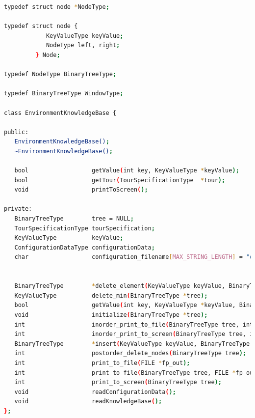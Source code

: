 \documentclass{CSSRforAfrica}
\begin{document}
\begin{appendices}
\begin{lstlisting}[style=withoutNumbering, language=bash]
typedef struct node *NodeType;

typedef struct node {
            KeyValueType keyValue;
            NodeType left, right;
         } Node;

typedef NodeType BinaryTreeType;

typedef BinaryTreeType WindowType;

class EnvironmentKnowledgeBase {

public:
   EnvironmentKnowledgeBase();
   ~EnvironmentKnowledgeBase();
   
   bool                  getValue(int key, KeyValueType *keyValue);   
   bool                  getTour(TourSpecificationType  *tour);     
   void                  printToScreen();                                      

private:
   BinaryTreeType        tree = NULL; 
   TourSpecificationType tourSpecification;
   KeyValueType          keyValue;
   ConfigurationDataType configurationData;
   char                  configuration_filename[MAX_STRING_LENGTH] = "environmentKnowledgeBaseConfiguration.ini";


   BinaryTreeType        *delete_element(KeyValueType keyValue, BinaryTreeType *tree);  
   KeyValueType          delete_min(BinaryTreeType *tree); 
   bool                  getValue(int key, KeyValueType *keyValue, BinaryTreeType *tree);   
   void                  initialize(BinaryTreeType *tree);                    
   int                   inorder_print_to_file(BinaryTreeType tree, int n, FILE *fp_out);    
   int                   inorder_print_to_screen(BinaryTreeType tree, int n);           
   BinaryTreeType        *insert(KeyValueType keyValue, BinaryTreeType *tree, bool update);   
   int                   postorder_delete_nodes(BinaryTreeType tree);      
   int                   print_to_file(FILE *fp_out);              
   int                   print_to_file(BinaryTreeType tree, FILE *fp_out);        
   int                   print_to_screen(BinaryTreeType tree);    
   void                  readConfigurationData();  
   void                  readKnowledgeBase();     
};


\end{lstlisting}

 \end{appendices}



\newpage

   
\end{document}
